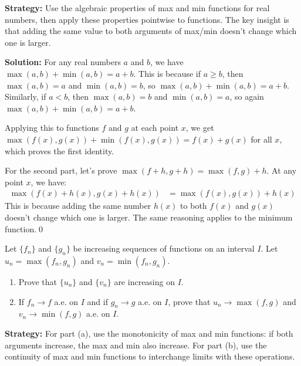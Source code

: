 \noindent\textbf{Strategy:} Use the algebraic properties of max and min functions for real numbers, then apply these properties pointwise to functions. The key insight is that adding the same value to both arguments of max/min doesn't change which one is larger.

\bigskip\noindent\textbf{Solution:}
For any real numbers $a$ and $b$, we have $\max(a, b) + \min(a, b) = a + b$. This is because if $a \geq b$, then $\max(a, b) = a$ and $\min(a, b) = b$, so $\max(a, b) + \min(a, b) = a + b$. Similarly, if $a < b$, then $\max(a, b) = b$ and $\min(a, b) = a$, so again $\max(a, b) + \min(a, b) = a + b$.

Applying this to functions $f$ and $g$ at each point $x$, we get $\max(f(x), g(x)) + \min(f(x), g(x)) = f(x) + g(x)$ for all $x$, which proves the first identity.

For the second part, let's prove $\max(f + h, g + h) = \max(f, g) + h$. At any point $x$, we have:
\begin{align*}
\max(f(x) + h(x), g(x) + h(x)) &= \max(f(x), g(x)) + h(x)
\end{align*}
This is because adding the same number $h(x)$ to both $f(x)$ and $g(x)$ doesn't change which one is larger. The same reasoning applies to the minimum function.\qed


\begin{problembox}
\begin{problemstatement}
Let $\{f_n\}$ and $\{g_n\}$ be increasing sequences of functions on an interval $I$. Let $u_n = \max(f_n, g_n)$ and $v_n = \min(f_n, g_n)$.
\begin{enumerate}[label=(\alph*)]
\item Prove that $\{u_n\}$ and $\{v_n\}$ are increasing on $I$.
\item If $f_n \to f$ a.e. on $I$ and if $g_n \to g$ a.e. on $I$, prove that $u_n \to \max(f, g)$ and $v_n \to \min(f, g)$ a.e. on $I$.
\end{enumerate}
\end{problemstatement}
\end{problembox}

\noindent\textbf{Strategy:} For part (a), use the monotonicity of max and min functions: if both arguments increase, the max and min also increase. For part (b), use the continuity of max and min functions to interchange limits with these operations.

